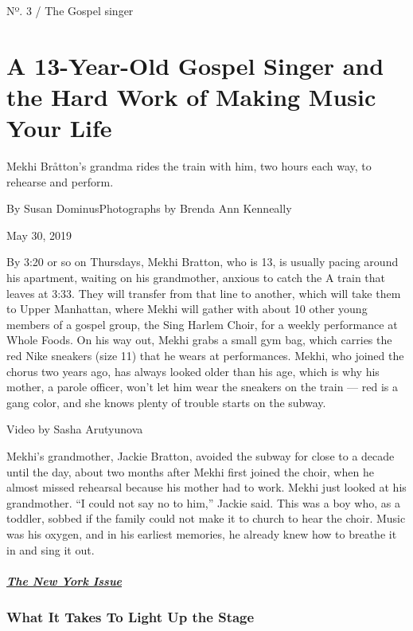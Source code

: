Nº. 3 / The Gospel singer

\hypertarget{a-13-year-old-gospel-singer-and-the-hard-work-of-making-music-your-life-1}{%
\section{A 13-Year-Old Gospel Singer and the Hard Work of Making Music
Your
Life}\label{a-13-year-old-gospel-singer-and-the-hard-work-of-making-music-your-life-1}}

Mekhi Bråtton's grandma rides the train with him, two hours each way, to
rehearse and perform.

By Susan DominusPhotographs by Brenda Ann Kenneally

May 30, 2019

By 3:20 or so on Thursdays, Mekhi Bratton, who is 13, is usually pacing
around his apartment, waiting on his grandmother, anxious to catch the A
train that leaves at 3:33. They will transfer from that line to another,
which will take them to Upper Manhattan, where Mekhi will gather with
about 10 other young members of a gospel group, the Sing Harlem Choir,
for a weekly performance at Whole Foods. On his way out, Mekhi grabs a
small gym bag, which carries the red Nike sneakers (size 11) that he
wears at performances. Mekhi, who joined the chorus two years ago, has
always looked older than his age, which is why his mother, a parole
officer, won't let him wear the sneakers on the train --- red is a gang
color, and she knows plenty of trouble starts on the subway.

 Video by Sasha Arutyunova

Mekhi's grandmother, Jackie Bratton, avoided the subway for close to a
decade until the day, about two months after Mekhi first joined the
choir, when he almost missed rehearsal because his mother had to work.
Mekhi just looked at his grandmother. ``I could not say no to him,''
Jackie said. This was a boy who, as a toddler, sobbed if the family
could not make it to church to hear the choir. Music was his oxygen, and
in his earliest memories, he already knew how to breathe it in and sing
it out.

\hypertarget{the-new-york-issue}{%
\subparagraph{\texorpdfstring{\href{https://www.nytimes3xbfgragh.onion/interactive/2019/05/30/magazine/performers-new-york.html}{The
New York Issue}}{The New York Issue}}\label{the-new-york-issue}}

\hypertarget{what-it-takes-to-light-up-the-stage}{%
\subsubsection{What It Takes To Light Up the
Stage}\label{what-it-takes-to-light-up-the-stage}}

